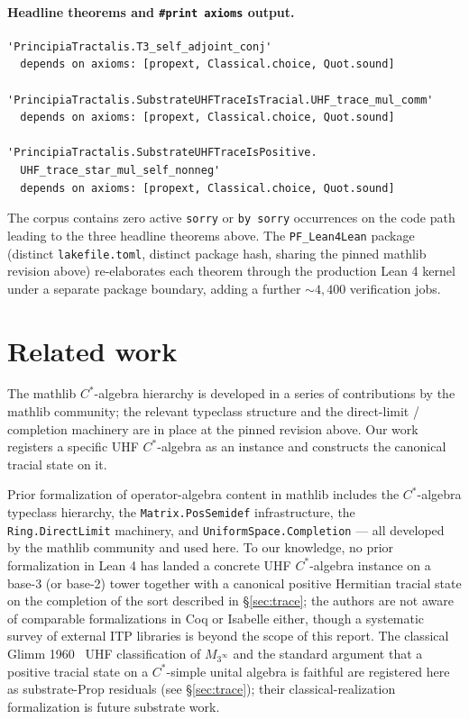 \documentclass[11pt,a4paper]{amsart}
\theoremstyle{plain}
\theoremstyle{definition}
\begin{document}
\paragraph{Headline theorems and \texttt{\#print axioms} output.}

\begin{small}
\begin{verbatim}
'PrincipiaTractalis.T3_self_adjoint_conj'
  depends on axioms: [propext, Classical.choice, Quot.sound]

'PrincipiaTractalis.SubstrateUHFTraceIsTracial.UHF_trace_mul_comm'
  depends on axioms: [propext, Classical.choice, Quot.sound]

'PrincipiaTractalis.SubstrateUHFTraceIsPositive.
  UHF_trace_star_mul_self_nonneg'
  depends on axioms: [propext, Classical.choice, Quot.sound]
\end{verbatim}
\end{small}

The corpus contains zero active \texttt{sorry} or \texttt{by sorry} occurrences on the code path leading to the three headline theorems above. The \texttt{PF\_Lean4Lean} package (distinct \texttt{lakefile.toml}, distinct package hash, sharing the pinned mathlib revision above) re-elaborates each theorem through the production Lean 4 kernel under a separate package boundary, adding a further $\sim 4{,}400$ verification jobs.

\section{Related work}\label{sec:related}

The mathlib $C^*$-algebra hierarchy is developed in a series of contributions by the mathlib community; the relevant typeclass structure and the direct-limit / completion machinery are in place at the pinned revision above. Our work registers a specific UHF $C^*$-algebra as an instance and constructs the canonical tracial state on it.

Prior formalization of operator-algebra content in mathlib includes the $C^*$-algebra typeclass hierarchy, the \texttt{Matrix.PosSemidef} infrastructure, the \texttt{Ring.DirectLimit} machinery, and \texttt{UniformSpace.Completion} — all developed by the mathlib community and used here. To our knowledge, no prior formalization in Lean 4 has landed a concrete UHF $C^*$-algebra instance on a base-3 (or base-2) tower together with a canonical positive Hermitian tracial state on the completion of the sort described in \S\ref{sec:trace}; the authors are not aware of comparable formalizations in Coq or Isabelle either, though a systematic survey of external ITP libraries is beyond the scope of this report. The classical Glimm 1960~\cite{glimm1960} UHF classification of $M_{3^\infty}$ and the standard argument that a positive tracial state on a $C^*$-simple unital algebra is faithful are registered here as substrate-Prop residuals (see \S\ref{sec:trace}); their classical-realization formalization is future substrate work.
\end{document}
